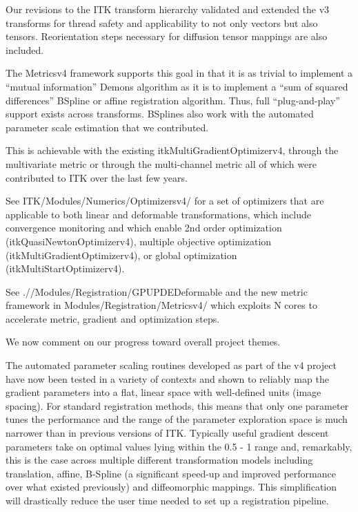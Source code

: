 \documentclass{frontiersSCNS}
\begin{document}

Our revisions to the ITK transform hierarchy validated and extended the v3 transforms for thread safety and applicability to not only vectors but also tensors.  Reorientation steps necessary for diffusion tensor mappings are also included.   

The Metricsv4 framework supports this goal in that it is as trivial to
implement a “mutual information” Demons algorithm as it is to
implement a “sum of squared differences” BSpline or affine
registration algorithm.  Thus, full “plug-and-play” support exists
across transforms.   BSplines also work with the automated parameter scale estimation that we contributed.  

This is achievable with the existing itkMultiGradientOptimizerv4,
through the multivariate metric or through the multi-channel metric
all of which were contributed to ITK over the last few years.

See ITK/Modules/Numerics/Optimizersv4/ for a set of optimizers that are applicable to both linear and deformable transformations, which include convergence monitoring and which enable 2nd order optimization (itkQuasiNewtonOptimizerv4), multiple objective optimization (itkMultiGradientOptimizerv4), or global optimization (itkMultiStartOptimizerv4).  

See .//Modules/Registration/GPUPDEDeformable and the new metric framework in Modules/Registration/Metricsv4/ which exploits N cores to accelerate metric, gradient and optimization steps.  

We now comment on our progress toward overall project themes.

The automated parameter scaling routines developed as part of the v4 project have now been tested in a variety of contexts and shown to reliably map the gradient parameters into a flat, linear space with well-defined units (image spacing). For standard registration methods, this means that only one parameter tunes the performance and the range of the parameter exploration space is much narrower than in previous versions of ITK. Typically useful gradient descent parameters take on optimal values lying within the 0.5 - 1 range and, remarkably, this is the case across multiple different transformation models including translation, affine, B-Spline (a significant speed-up and improved performance over what existed previously) and diffeomorphic mappings. This simplification will drastically reduce the user time needed to set up a registration pipeline. 
\end{document}
